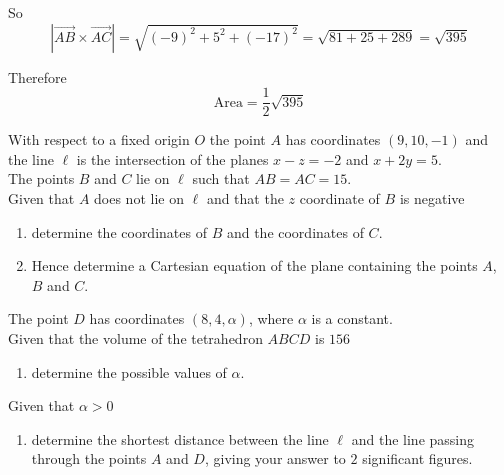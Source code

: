 \documentclass[leqno]{article}
\begin{document}
\begin{enumerate}[
  label=\textbf{\arabic*.},
  leftmargin=*,
  topsep=0pt,
  partopsep=0pt,
  parsep=0pt
]
\begin{djsSolution}
So
\[
\left|\overrightarrow{AB}\times\overrightarrow{AC}\right|
=\sqrt{(-9)^2+5^2+(-17)^2}
=\sqrt{81+25+289}
=\sqrt{395}
\]

Therefore
\[
\text{Area}=\frac12\sqrt{395}
\]
\end{djsSolution}


\newpage

\questionitem

With respect to a fixed origin $O$ the point $A$ has coordinates $(9,10,-1)$ and the line $\ell$ is the intersection of the planes $x-z=-2$ and $x+2y=5$. \\

The points $B$ and $C$ lie on $\ell$ such that $AB=AC=15$. \\

Given that $A$ does not lie on $\ell$ and that the $z$ coordinate of $B$ is negative \\

\begin{enumerate}[label=\textbf{(\alph*)}]
  \item determine the coordinates of $B$ and the coordinates of $C$.  \\
  \item Hence determine a Cartesian equation of the plane containing the points $A$, $B$ and $C$.  \\
\end{enumerate}
The point $D$ has coordinates $(8,4,\alpha)$, where $\alpha$ is a constant. \\

Given that the volume of the tetrahedron $ABCD$ is $156$ \\

\begin{enumerate}[label=\textbf{(\alph*)}, resume]
  \item determine the possible values of $\alpha$.  \\
\end{enumerate}
Given that $\alpha>0$ \\

\begin{enumerate}[label=\textbf{(\alph*)}, resume]
  \item determine the shortest distance between the line $\ell$ and the line passing through the points $A$ and $D$, giving your answer to $2$ significant figures.  \\
\end{enumerate}


\end{enumerate}
\end{document}
